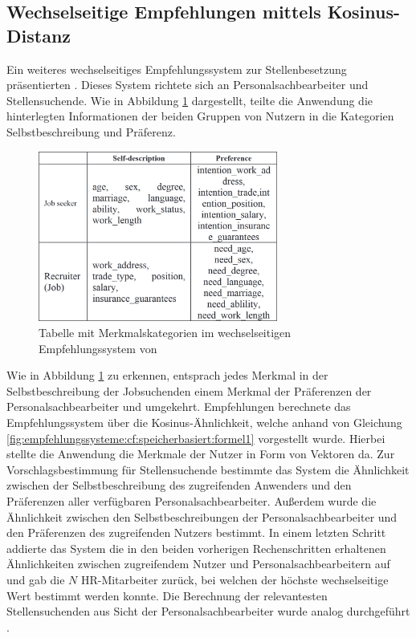 \subsection{Wechselseitige Empfehlungen mittels Kosinus-Distanz}
\label{ch:verwandteArbeiten:nichtAufDemPEFitBasierendeBilateraleSysteme:nutzer}
Ein weiteres wechselseitiges Empfehlungssystem zur Stellenbesetzung präsentierten \textcite[S. 1ff.]{wenxing:2015}. Dieses System richtete sich an Personalsachbearbeiter und Stellensuchende. Wie in Abbildung \ref{fig:verwandteArbeiten:nichtAufDemPEFitBasierendeBilateraleSysteme:abb1} dargestellt, teilte die Anwendung die hinterlegten Informationen der beiden Gruppen von Nutzern in die Kategorien Selbstbeschreibung und Präferenz.

\begin{figure}[h]
	\centering
	\includegraphics[width=0.7\textwidth]{gfx/hong-tabelle.png}
	\caption{Tabelle mit Merkmalskategorien im wechselseitigen Empfehlungssystem von \textcite[S. 2]{wenxing:2015}}
	\label{fig:verwandteArbeiten:nichtAufDemPEFitBasierendeBilateraleSysteme:abb1}
\end{figure}

Wie in Abbildung \ref{fig:verwandteArbeiten:nichtAufDemPEFitBasierendeBilateraleSysteme:abb1} zu erkennen, entsprach jedes Merkmal in der Selbstbeschreibung der Jobsuchenden einem Merkmal der Präferenzen der Personalsachbearbeiter und umgekehrt. Empfehlungen berechnete das Empfehlungssystem über die Kosinus-Ähnlichkeit, welche anhand von Gleichung \ref{fig:empfehlungssysteme:cf:speicherbasiert:formel1} vorgestellt wurde. Hierbei stellte die Anwendung die Merkmale der Nutzer in Form von Vektoren da. Zur Vorschlagsbestimmung für Stellensuchende bestimmte das System die Ähnlichkeit zwischen der Selbstbeschreibung des zugreifenden Anwenders und den Präferenzen aller verfügbaren Personalsachbearbeiter. Außerdem wurde die Ähnlichkeit zwischen den Selbstbeschreibungen der Personalsachbearbeiter und den Präferenzen des zugreifenden Nutzers bestimmt. In einem letzten Schritt addierte das System die in den beiden vorherigen Rechenschritten erhaltenen Ähnlichkeiten zwischen zugreifendem Nutzer und Personalsachbearbeitern auf und gab die $N$ HR-Mitarbeiter zurück, bei welchen der höchste wechselseitige Wert bestimmt werden konnte. Die Berechnung der relevantesten Stellensuchenden aus Sicht der Personalsachbearbeiter wurde analog durchgeführt \cite[S. 2f.]{wenxing:2015}.

